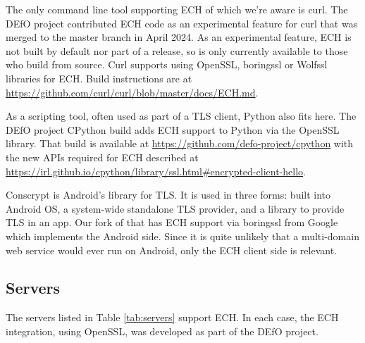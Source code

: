 The only command line tool supporting ECH of which we're aware is curl. The
DEfO project
contributed ECH code as an experimental feature for curl that was merged to the
master branch in April 2024. As an experimental feature, ECH is not built by
default nor part of a release, so is only currently available to those who
build from source. Curl supports using OpenSSL, boringssl or Wolfssl libraries
for ECH.  Build instructions are at
\url{https://github.com/curl/curl/blob/master/docs/ECH.md}.

As a scripting tool, often used as part of a TLS client, Python also fits here.
The DEfO project CPython build adds ECH support to Python via the OpenSSL
library.  That build is available at
\url{https://github.com/defo-project/cpython} with the new APIs required for
ECH described at
\url{https://irl.github.io/cpython/library/ssl.html#encrypted-client-hello}.

Conscrypt is Android's library for TLS. It is used in three forms: built into
Android OS, a system-wide standalone TLS provider, and a library to provide TLS
in an app. Our fork of that has ECH support via boringssl from Google 
which implements the Android side. Since it is quite unlikely that a
multi-domain web service would ever run on Android, only the ECH client side is
relevant.

\subsection{Servers}

The servers listed in Table \ref{tab:servers} support ECH. In each case,
the ECH integration, using OpenSSL, was developed as part of the DEfO
project.

